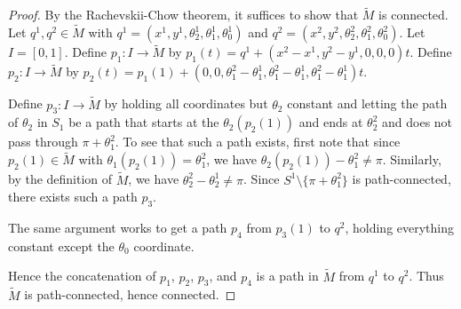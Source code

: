 \documentclass{article}
\begin{document}
\begin{proof}
By the Rachevskii-Chow theorem, it suffices to show that $\widetilde M$ is connected.  Let $q^1, q^2 \in \widetilde M$ with $q^1 = (x^1, y^1, \theta_2^1, \theta_1^1, \theta_0^1)$ and $q^2 = (x^2, y^2, \theta_2^2, \theta_1^2, \theta_0^2)$.  Let $I = [0,1]$. Define $p_1:I \to \widetilde M$ by $p_1(t) = q^1 + (x^2 - x^1 , y^2 - y^1, 0 ,0 ,0)t$.  Define $p_2: I \to \widetilde M$ by $p_2(t) = p_1(1) + (0, 0, \theta_1^2 - \theta_1^1, \theta_1^2 - \theta_1^1, \theta_1^2 - \theta_1^1) t$.   

Define $p_3: I \to \widetilde M$ by holding all coordinates but $\theta_2$ constant and letting the path of $\theta_2$ in $S_1$ be a path that starts at the $\theta_2(p_2(1))$ and ends at $\theta^2_2$ and does not pass through $\pi + \theta_1^2$.  To see that such a path exists, first note that since $p_2(1) \in \widetilde M$ with $\theta_1(p_2(1)) = \theta^2_1$, we have $\theta_2(p_2(1)) - \theta^2_1 \neq \pi$.  Similarly, by the definition of $\widetilde M$, we have $\theta_2^2 - \theta_2^1 \neq \pi$. Since $S^1 \setminus \{ \pi + \theta_1^2 \}$ is path-connected, there exists such a path $p_3$.  

The same argument works to get a path $p_4$ from $p_3(1)$ to $q^2$, holding everything constant except the $\theta_0$ coordinate.

Hence the concatenation of $p_1$, $p_2$, $p_3$, and $p_4$ is a path in $\widetilde M$ from $q^1$ to $q^2$. Thus $\widetilde M$ is path-connected, hence connected.
\end{proof}
\end{document}
